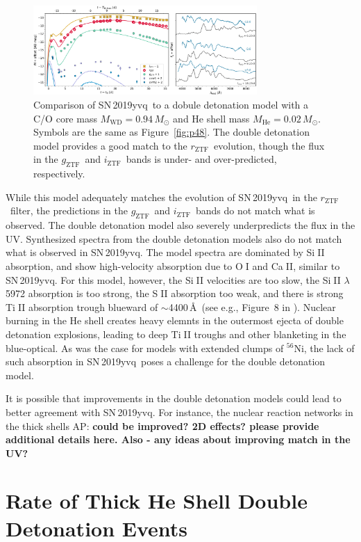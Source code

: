 \documentclass[twocolumn]{aastex63}
\def\ion#1#2{#1$\;${\footnotesize\rm{#2}}\relax}
\newcommand{\abi}[1]{{\color{LincolnGreen} AP: \textbf{#1}}}
\newcommand{\rztf}{$r_\mathrm{ZTF}$}
\newcommand{\gztf}{$g_\mathrm{ZTF}$}
\newcommand{\iztf}{$i_\mathrm{ZTF}$}
\newcommand{\radni}{$^{56}$Ni}
\newcommand{\sn}{SN\,2019yvq}
\begin{document}
\begin{figure}
    \centering
    \includegraphics[width=3.35in]{./figures/double_det.pdf}
    \caption{Comparison of \sn\ to a dobule detonation model with a C/O core
    mass $M_\mathrm{WD} = 0.94\,M_\odot$ and He shell mass $M_\mathrm{He} =
    0.02\,M_\odot$. Symbols are the same as Figure~\ref{fig:p48}. The double
    detonation model provides a good match to the \rztf\ evolution, though
    the flux in the \gztf\ and \iztf\ bands is under- and over-predicted,
    respectively.}
    \label{fig:double_det}
\end{figure}

While this model adequately matches the evolution of \sn\ in the \rztf\
filter, the predictions in the \gztf\ and \iztf\ bands do not match what is
observed. The double detonation model also severely underpredicts the flux in
the UV. Synthesized spectra from the double detonation models also do not
match what is observed in \sn. The model spectra are dominated by
\ion{Si}{II} absorption, and show high-velocity absorption due to \ion{O}{I}
and \ion{Ca}{II}, similar to \sn. For this model, however, the \ion{Si}{II}
velocities are too slow, the \ion{Si}{II} $\lambda$5972 absorption is too
strong, the \ion{S}{II} absorption too weak, and there is strong \ion{Ti}{II}
absorption trough blueward of $\sim$4400\,\AA\ (see e.g., Figure~8 in
\citealt{Polin19}). Nuclear burning in the He shell creates heavy elemnts in
the outermost ejecta of double detonation explosions, leading to deep
\ion{Ti}{II} troughs and other blanketing in the blue-optical. As was the
case for models with extended clumps of \radni, the lack of such absorption
in \sn\ poses a challenge for the double detonation model.

It is possible that improvements in the double detonation models could lead
to better agreement with \sn. For instance, the nuclear reaction networks in
the thick shells \abi{could be improved? 2D effects? please provide
additional details here. Also - any ideas about improving match in the UV?}


\section{Rate of Thick He Shell Double Detonation Events}\label{sec:rates}
\end{document}

